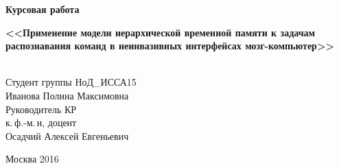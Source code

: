 \documentclass[specialist,
substylefile = spbu.rtx,
               subf,href,colorlinks=true, 12pt]{disser}
\begin{document}
\begin{center}
	\vspace{13ex}
	\textbf{\Large{Курсовая работа}}
	\vspace{1ex}

	\textbf{
	\Large{<<Применение модели иерархической временной памяти к задачам распознавания команд в неинвазивных интерфейсах мозг-компьютер>>}}
	
\vspace{10ex}	
	\begin{flushright}
		\noindent
		\\Студент группы НоД\_ИССА15
		\\Иванова Полина Максимовна
		\\Руководитель КР\\к.\,ф.-м.\,н, доцент
		\\Осадчий Алексей Евгеньевич
	\end{flushright}
	
	\vfill
	Москва 2016
\end{center}

\tableofcontents
\intro 







\end{document}
